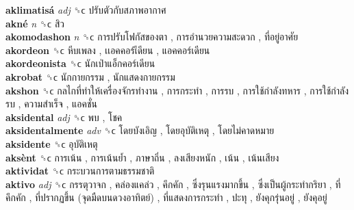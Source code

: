 \textbf{aklimatisá} \emph{adj}  ␝ϲ   ปรับตัวกับสภาพอากาศ   \\
\textbf{akné} \emph{n}  ␝ϲ   สิว   \\
\textbf{akomodashon} \emph{n}  ␝ϲ   การปรับโฟกัสของตา ,  การอำนวยความสะดวก ,  ที่อยู่อาศัย   \\
\textbf{akordeon} ␝ϲ   หีบเพลง ,  เเอคคอร์เีดียน ,  แอคคอร์เดียน   \\
\textbf{akordeonista} ␝ϲ   นักเป่าแอ็กคอร์เดียน   \\
\textbf{akrobat} ␝ϲ   นักกายกรรม ,  นักแสดงกายกรรม   \\
\textbf{akshon} ␝ϲ   กลไกที่ทำให้เครื่องจักรทำงาน ,  การกระทำ ,  การรบ ,  การใช้กำลังทหาร ,  การใช้กำลังรบ ,  ความสำเร็จ ,  แอคชั่น   \\
\textbf{aksidental} \emph{adj}  ␝ϲ   พบ ,  โชค   \\
\textbf{aksidentalmente} \emph{adv}  ␝ϲ   โดยบังเอิญ ,  โดยอุบัติเหตุ ,  โดยไม่คาดหมาย   \\
\textbf{aksidente} ␝ϲ   อุบัติเหตุ   \\
\textbf{aksènt} ␝ϲ   การเน้น ,  การเน้นย้ำ ,  ภาษาถิ่น ,  ลงเสียงหนัก ,  เน้น ,  เน้นเสียง   \\
\textbf{aktividat} ␝ϲ   กระบวนการตามธรรมชาติ   \\
\textbf{aktivo} \emph{adj}  ␝ϲ   กรรตุวาจก ,  คล่องแคล่ว ,  คึกคัก ,  ซึ่งรุนแรงมากขึ้น ,  ซึ่งเป็นผู้กระทำกริยา ,  ที่คึกคัก ,  ที่ปรากฏขึ้น (จุดมืดบนดวงอาทิตย์) ,  ที่แสดงการกระทำ ,  ปะทุ ,  ยังคุกรุ่นอยู่ ,  ยังคุอยู่   \\
